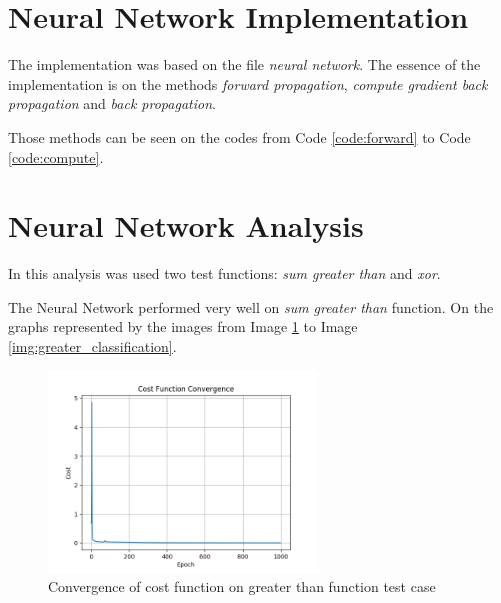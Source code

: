 \documentclass[journal]{IEEEtran}
\begin{document}
\section{Neural Network Implementation}

The implementation was based on the file \textit{neural network}. The essence of the implementation is on the methods \textit{forward propagation}, \textit{compute gradient back propagation} and \textit{back propagation}.

Those methods can be seen on the codes from Code \ref{code:forward} to Code \ref{code:compute}.







\section{Neural Network Analysis}

In this analysis was used two test functions: \textit{sum greater than} and \textit{xor}.

The Neural Network performed very well on \textit{sum greater than} function. On the graphs represented by the images from Image \ref{img:greater_cost} to Image \ref{img:greater_classification}.

\begin{figure}
  \begin{center}
  \includegraphics[width=2.8in]{./../code/result_greater_than/cost_function_convergence.png}
  \caption{Convergence of cost function on greater than function test case}
  \label{img:greater_cost}
  \end{center}
\end{figure}
\end{document}
